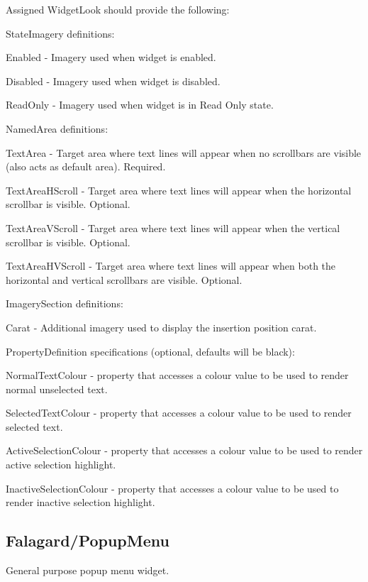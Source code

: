 Assigned Widget\+Look should provide the following\+: 
\begin{DoxyItemize}
\item State\+Imagery definitions\+: 
\begin{DoxyItemize}
\item Enabled -\/ Imagery used when widget is enabled. 
\item Disabled -\/ Imagery used when widget is disabled. 
\item Read\+Only -\/ Imagery used when widget is in \textquotesingle{}Read Only\textquotesingle{} state. 
\end{DoxyItemize}


\item Named\+Area definitions\+: 
\begin{DoxyItemize}
\item Text\+Area -\/ Target area where text lines will appear when no scrollbars are visible (also acts as default area). Required. 
\item Text\+Area\+H\+Scroll -\/ Target area where text lines will appear when the horizontal scrollbar is visible. Optional. 
\item Text\+Area\+V\+Scroll -\/ Target area where text lines will appear when the vertical scrollbar is visible. Optional. 
\item Text\+Area\+H\+V\+Scroll -\/ Target area where text lines will appear when both the horizontal and vertical scrollbars are visible. Optional. 
\end{DoxyItemize}


\item Imagery\+Section definitions\+: 
\begin{DoxyItemize}
\item Carat -\/ Additional imagery used to display the insertion position carat. 
\end{DoxyItemize}


\item Property\+Definition specifications (optional, defaults will be black)\+: 
\begin{DoxyItemize}
\item Normal\+Text\+Colour -\/ property that accesses a colour value to be used to render normal unselected text. 
\item Selected\+Text\+Colour -\/ property that accesses a colour value to be used to render selected text. 
\item Active\+Selection\+Colour -\/ property that accesses a colour value to be used to render active selection highlight. 
\item Inactive\+Selection\+Colour -\/ property that accesses a colour value to be used to render inactive selection highlight. 
\end{DoxyItemize}
\end{DoxyItemize}\hypertarget{fal_wr_ref_fal_wr_ref_sec_14}{}\subsection{Falagard/\+Popup\+Menu}\label{fal_wr_ref_fal_wr_ref_sec_14}
General purpose popup menu widget.

